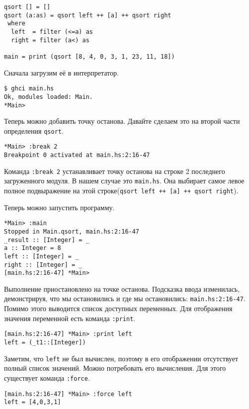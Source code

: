 \documentclass[14pt]{extarticle}
\def\code#1{\texttt{#1}}
\begin{document}
\begin{lstlisting}[caption=main.hs]
qsort [] = []
qsort (a:as) = qsort left ++ [a] ++ qsort right
 where 
  left  = filter (<=a) as
  right = filter (a<) as

main = print (qsort [8, 4, 0, 3, 1, 23, 11, 18])
\end{lstlisting}

Сначала загрузим её в интерпретатор.

\begin{lstlisting}
$ ghci main.hs
Ok, modules loaded: Main.
*Main>
\end{lstlisting}

Теперь можно добавить точку останова. Давайте сделаем это на второй части
определения \code{qsort}.

\begin{lstlisting}
*Main> :break 2
Breakpoint 0 activated at main.hs:2:16-47
\end{lstlisting}

Команда \code{:break 2} устанавливает точку останова на строке 2 последнего
загруженного модуля. В нашем случае это \code{main.hs}. Она выбирает самое
левое полное подвыражение на этой строке(\code{qsort left ++ [a] ++ qsort
right}).

Теперь можно запустить программу.

\begin{lstlisting}
*Main> :main
Stopped in Main.qsort, main.hs:2:16-47
_result :: [Integer] = _
a :: Integer = 8
left :: [Integer] = _
right :: [Integer] = _
[main.hs:2:16-47] *Main> 
\end{lstlisting}

Выполнение приостановлено на точке останова. Подсказка ввода изменилась,
демонстрируя, что мы остановились и где мы остановились:
\code{main.hs:2:16-47}. Помимо этого выводится список доступных переменных.
Для отображения значения переменной есть команда \code{:print}.

\begin{lstlisting}
[main.hs:2:16-47] *Main> :print left
left = (_t1::[Integer])
\end{lstlisting}

Заметим, что \code{left} не был вычислен, поэтому в его отображении отсутствует
полный список значений. Можно потребовать его вычисления. Для этого существует
команда \code{:force}. 

\begin{lstlisting}
[main.hs:2:16-47] *Main> :force left
left = [4,0,3,1]
\end{lstlisting}
\end{document}
